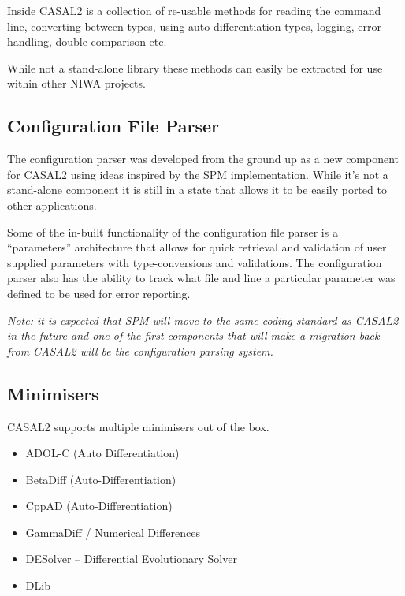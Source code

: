 \documentclass[a4paper,11pt,twoside,pdftex,draft]{article}
\begin{document}
Inside CASAL2 is a collection of re-usable methods for reading the
command line, converting between types, using auto-differentiation
types, logging, error handling, double comparison etc.

While not a stand-alone library these methods can easily be extracted
for use within other NIWA projects.

\hypertarget{configuration-file-parser}{%
\subsection{Configuration File Parser}\label{configuration-file-parser}}

The configuration parser was developed from the ground up as a new
component for CASAL2 using ideas inspired by the SPM implementation.
While it's not a stand-alone component it is still in a state that
allows it to be easily ported to other applications.

Some of the in-built functionality of the configuration file parser is a
``parameters'' architecture that allows for quick retrieval and
validation of user supplied parameters with type-conversions and
validations. The configuration parser also has the ability to track what
file and line a particular parameter was defined to be used for error
reporting.

\emph{Note: it is expected that SPM will move to the same coding
standard as CASAL2 in the future and one of the first components that
will make a migration back from CASAL2 will be the configuration parsing
system.}

\hypertarget{minimisers}{%
\subsection{Minimisers}\label{minimisers}}

CASAL2 supports multiple minimisers out of the box.

\begin{itemize}
\item
  ADOL-C (Auto Differentiation)
\item
  BetaDiff (Auto-Differentiation)
\item
  CppAD (Auto-Differentiation)
\item
  GammaDiff / Numerical Differences
\item
  DESolver -- Differential Evolutionary Solver
\item
  DLib
\end{itemize}
\end{document}
